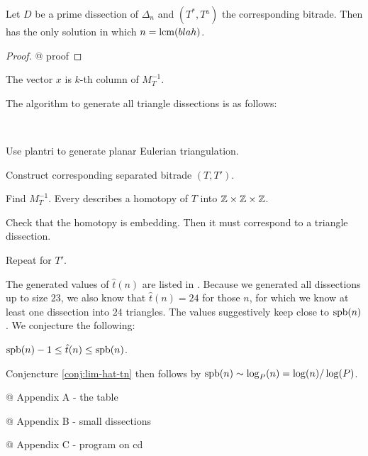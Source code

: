 \begin{lem}
Let $D$ be a prime dissection of $\Delta_n$ and $(T^*, T^\vartriangle)$ the corresponding bitrade. Then
%
has the only solution in which $n = \mathop{\mathrm{lcm}}(blah)$.
\end{lem}
\begin{proof}
@ proof
\end{proof}

\begin{cor}
The vector $x$ is $k$-th column of $M_T^{-1}$.
\end{cor}%

The algorithm to generate all triangle dissections is as follows:

\begin{alg}\ 
\begin{cosyenumerate}
	\item Use plantri to generate planar Eulerian triangulation.
	\item Construct corresponding separated bitrade $(T,T')$.
	\item Find $M_T^{-1}$. Every  describes a homotopy of $T$ into $\mathbb Z\times\mathbb Z\times\mathbb Z$.
	\item Check that the homotopy is embedding. Then it must correspond to a triangle dissection.
	\item Repeat for $T'$.
\end{cosyenumerate}
\end{alg}%

The generated values of $\hat t(n)$ are listed in . Because we generated all dissections up to size $23$, we also know that $\hat t(n) = 24$ for those $n$, for which we know at least one dissection into $24$ triangles. The values suggestively keep close to $\mathop{\mathrm{spb}}(n)$. We conjecture the following:

\begin{conj} $\mathop{\mathrm{spb}}(n)-1 \leq \hat t(n) \leq \mathop{\mathrm{spb}}(n)$.
\end{conj}%

Conjencture \ref{conj:lim-hat-tn} then follows by $\mathop{\mathrm{spb}}(n) \sim \log_P(n) = \log(n)/\log(P)$.


@ Appendix A - the table

@ Appendix B - small dissections

@ Appendix C - program on cd


